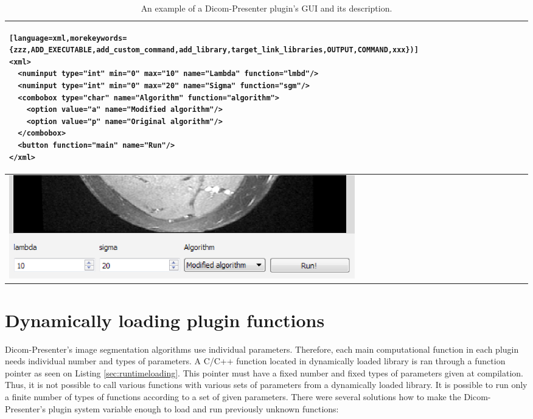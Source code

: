 \begin{table}[h]
	\caption{An example of a Dicom-Presenter plugin's GUI and its description.}
	\begin{tabular}{|m{\textwidth}|}
	\hline
\begin{lstlisting}[language=xml,morekeywords={zzz,ADD_EXECUTABLE,add_custom_command,add_library,target_link_libraries,OUTPUT,COMMAND,xxx})]
<xml>
  <numinput type="int" min="0" max="10" name="Lambda" function="lmbd"/>
  <numinput type="int" min="0" max="20" name="Sigma" function="sgm"/>
  <combobox type="char" name="Algorithm" function="algorithm">
    <option value="a" name="Modified algorithm"/>
    <option value="p" name="Original algorithm"/>
  </combobox>
  <button function="main" name="Run"/>
</xml>
\end{lstlisting}
		\\
		  \hline		
		  \noalign{\smallskip}
			\includegraphics[width=\textwidth]{Text/IMG/Plugins.png}
		\\
		\hline
		\end{tabular}
\end{table}%

\lstset{numbers=left,frame=single,}







\section{Dynamically loading plugin functions}

Dicom-Presenter's image segmentation algorithms use individual parameters. Therefore, each main computational function in each plugin needs individual number and types of parameters. A C/C++ function located in dynamically loaded library is ran through a function pointer as seen on Listing \ref{sec:runtimeloading}. This pointer must have a fixed number and fixed types of parameters given at compilation. Thus, it is not possible to call various functions with various sets of parameters from a dynamically loaded library. It is possible to run only a finite number of types of functions according to a set of given parameters. There were several solutions how to make the Dicom-Presenter's plugin system variable enough to load and run previously unknown functions:

